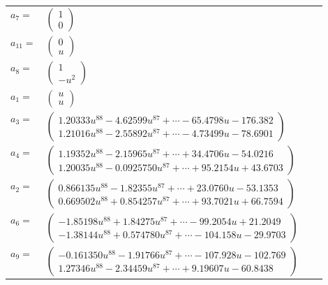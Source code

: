 \documentclass[1p]{elsarticle_modified}
\theoremstyle{definition}
\begin{document}
\begin{tabular}{m{7pt} m{180pt} m{7pt} m{180pt} }
\flushright $a_{7}=$&$\begin{pmatrix}1\\0\end{pmatrix}$ \\
\flushright $a_{11}=$&$\begin{pmatrix}0\\u\end{pmatrix}$ \\
\flushright $a_{8}=$&$\begin{pmatrix}1\\- u^2\end{pmatrix}$ \\
\flushright $a_{1}=$&$\begin{pmatrix}u\\u\end{pmatrix}$ \\
\flushright $a_{3}=$&$\begin{pmatrix}1.20333 u^{88}-4.62599 u^{87}+\cdots-65.4798 u-176.382\\1.21016 u^{88}-2.55892 u^{87}+\cdots-4.73499 u-78.6901\end{pmatrix}$ \\
\flushright $a_{4}=$&$\begin{pmatrix}1.19352 u^{88}-2.15965 u^{87}+\cdots+34.4706 u-54.0216\\1.20035 u^{88}-0.0925750 u^{87}+\cdots+95.2154 u+43.6703\end{pmatrix}$ \\
\flushright $a_{2}=$&$\begin{pmatrix}0.866135 u^{88}-1.82355 u^{87}+\cdots+23.0760 u-53.1353\\0.669502 u^{88}+0.854257 u^{87}+\cdots+93.7021 u+66.7594\end{pmatrix}$ \\
\flushright $a_{6}=$&$\begin{pmatrix}-1.85198 u^{88}+1.84275 u^{87}+\cdots-99.2054 u+21.2049\\-1.38144 u^{88}+0.574780 u^{87}+\cdots-104.158 u-29.9703\end{pmatrix}$ \\
\flushright $a_{9}=$&$\begin{pmatrix}-0.161350 u^{88}-1.91766 u^{87}+\cdots-107.928 u-102.769\\1.27346 u^{88}-2.34459 u^{87}+\cdots+9.19607 u-60.8438\end{pmatrix}$ \\

\end{tabular}
\end{document}
